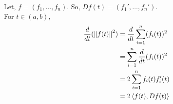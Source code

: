 \begin{soln}{10}
  Let, $ f = (f_1,\ldots,f_n) $. So, $ Df(t) = (f_1',\ldots,f_n') $.
   \\ 
   For $ t \in (a,b) $, \begin{align*}
    \frac{d}{dt}(\norm{f(t)}^2) 
    &= \frac{d}{dt}\sum_{i=1}^{n}(f_i(t))^2  \\ 
    &= \sum_{i=1}^{n}\frac{d}{dt}(f_i(t))^2  \\ 
    &= 2\sum_{i=1}^{n}f_i(t)f_i'(t)  \\ 
    &= 2\left\langle {f(t),Df(t)} \right\rangle
   \end{align*}
\end{soln}